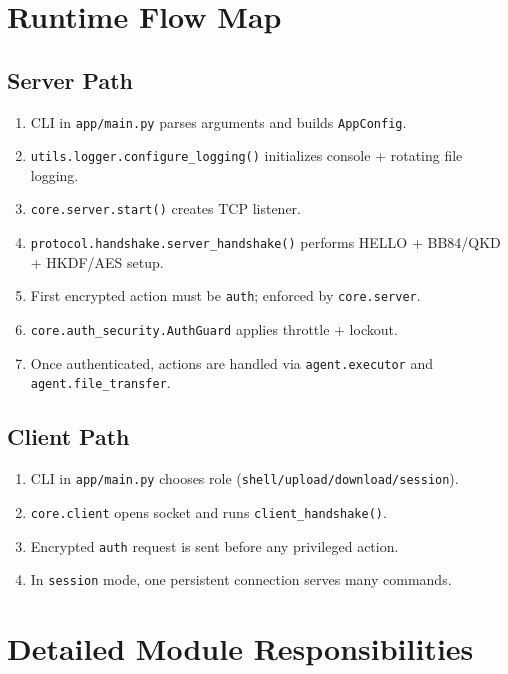 \documentclass[11pt,a4paper]{article}
\begin{document}
\section{Runtime Flow Map}

\subsection{Server Path}
\begin{enumerate}[leftmargin=1.4em]
  \item CLI in \texttt{app/main.py} parses arguments and builds \texttt{AppConfig}.
  \item \texttt{utils.logger.configure\_logging()} initializes console + rotating file logging.
  \item \texttt{core.server.start()} creates TCP listener.
  \item \texttt{protocol.handshake.server\_handshake()} performs HELLO + BB84/QKD + HKDF/AES setup.
  \item First encrypted action must be \texttt{auth}; enforced by \texttt{core.server}.
  \item \texttt{core.auth\_security.AuthGuard} applies throttle + lockout.
  \item Once authenticated, actions are handled via \texttt{agent.executor} and \texttt{agent.file\_transfer}.
\end{enumerate}

\subsection{Client Path}
\begin{enumerate}[leftmargin=1.4em]
  \item CLI in \texttt{app/main.py} chooses role (\texttt{shell/upload/download/session}).
  \item \texttt{core.client} opens socket and runs \texttt{client\_handshake()}.
  \item Encrypted \texttt{auth} request is sent before any privileged action.
  \item In \texttt{session} mode, one persistent connection serves many commands.
\end{enumerate}

\section{Detailed Module Responsibilities}
\end{document}
